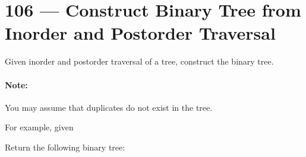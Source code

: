\section{106 --- Construct Binary Tree from Inorder and Postorder Traversal}
Given inorder and postorder traversal of a tree, construct the binary tree.

\paragraph{Note:}
You may assume that duplicates do not exist in the tree.

For example, given



Return the following binary tree:

\begin{figure}[H]
\end{figure}
